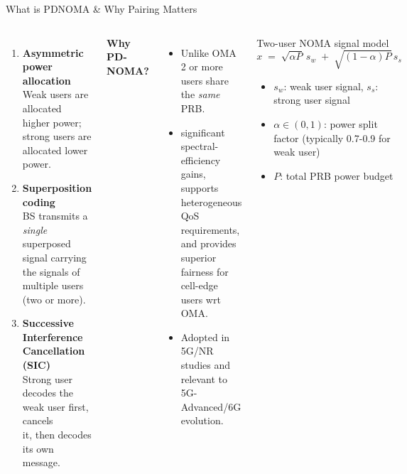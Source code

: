 \documentclass[aspectratio=169]{beamer}
\begin{document}
\begin{frame}[t]{What is PD\text{-}NOMA \& Why Pairing Matters}
\small
\begin{columns}[t,onlytextwidth]

   \vspace{-.9cm}
  \begin{enumerate}\itemsep0.25em
    \item \textbf{Asymmetric power allocation}\\
          Weak users are allocated higher power; \\strong users are allocated lower power.
    \item \textbf{Superposition coding}\\
          BS transmits a \emph{single} superposed signal carrying the signals of multiple users (two or more).
    \item \textbf{Successive Interference Cancellation (SIC)}\\
          Strong user decodes the weak user first, cancels \\ it, then decodes its own message.
  \end{enumerate}


  \textbf{Why PD-NOMA?}
  \begin{itemize}\itemsep0.2em
    \item Unlike OMA 2 or more users share the \emph{same} PRB.
    \item significant spectral-efficiency gains, supports heterogeneous QoS requirements, and provides superior fairness for cell-edge users wrt OMA.
    \item Adopted in 5G/NR studies and relevant to 5G-Advanced/6G evolution.
  \end{itemize}
    
  \vspace{-.95cm}
  \begin{block}{Two-user NOMA signal model}
    \vspace{-0.35em}
    \[
      x \;=\; \sqrt{\alpha P}\,s_w \;+\; \sqrt{(1-\alpha)P}\,s_s
    \]
    \vspace{-.8cm}
    \begin{itemize}\itemsep0.1em
      \item $s_w$: weak user signal, \; $s_s$: strong user signal
      \item $\alpha \in (0,1)$: power split factor (typically 0.7-0.9 for weak user)
      \item $P$: total PRB power budget
    \end{itemize}
  \end{block}


\end{columns}
\end{frame}
\end{document}
